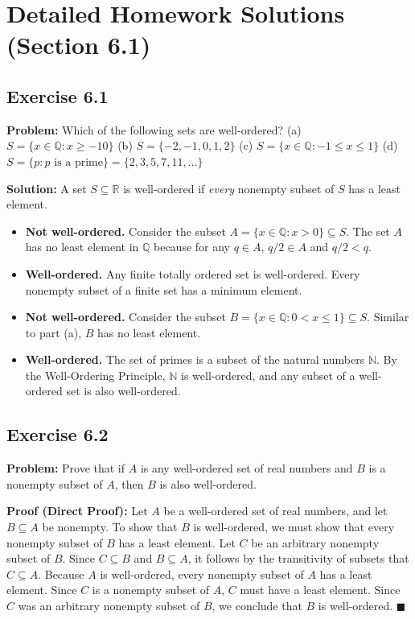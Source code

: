 \documentclass[11pt, a4paper]{article}
\theoremstyle{definition}
\theoremstyle{remark}
\newcommand{\R}{\mathbb{R}}
\newcommand{\N}{\mathbb{N}}
\newcommand{\Q}{\mathbb{Q}}
\begin{document}
\newpage
\section{Detailed Homework Solutions (Section 6.1)}

\subsection*{Exercise 6.1}
\textbf{Problem:} Which of the following sets are well-ordered?
(a) $S = \{x \in \Q : x \ge -10\}$ \quad
(b) $S = \{-2, -1, 0, 1, 2\}$ \quad
(c) $S = \{x \in \Q : -1 \le x \le 1\}$ \quad
(d) $S = \{p : p \text{ is a prime}\} = \{2, 3, 5, 7, 11, \dots\}$

\textbf{Solution:}
A set $S \subseteq \R$ is well-ordered if \textit{every} nonempty subset of $S$ has a least element.
\begin{itemize}
    \item[(a)] \textbf{Not well-ordered.} Consider the subset $A = \{x \in \Q : x > 0\} \subseteq S$. The set $A$ has no least element in $\Q$ because for any $q \in A$, $q/2 \in A$ and $q/2 < q$.
    \item[(b)] \textbf{Well-ordered.} Any finite totally ordered set is well-ordered. Every nonempty subset of a finite set has a minimum element.
    \item[(c)] \textbf{Not well-ordered.} Consider the subset $B = \{x \in \Q : 0 < x \le 1\} \subseteq S$. Similar to part (a), $B$ has no least element.
    \item[(d)] \textbf{Well-ordered.} The set of primes is a subset of the natural numbers $\N$. By the Well-Ordering Principle, $\N$ is well-ordered, and any subset of a well-ordered set is also well-ordered.
\end{itemize}

\subsection*{Exercise 6.2}
\textbf{Problem:} Prove that if $A$ is any well-ordered set of real numbers and $B$ is a nonempty subset of $A$, then $B$ is also well-ordered.

\textbf{Proof (Direct Proof):}
Let $A$ be a well-ordered set of real numbers, and let $B \subseteq A$ be nonempty. To show that $B$ is well-ordered, we must show that every nonempty subset of $B$ has a least element. 
Let $C$ be an arbitrary nonempty subset of $B$. Since $C \subseteq B$ and $B \subseteq A$, it follows by the transitivity of subsets that $C \subseteq A$. 
Because $A$ is well-ordered, every nonempty subset of $A$ has a least element. Since $C$ is a nonempty subset of $A$, $C$ must have a least element. 
Since $C$ was an arbitrary nonempty subset of $B$, we conclude that $B$ is well-ordered. \hfill $\blacksquare$
\end{document}
